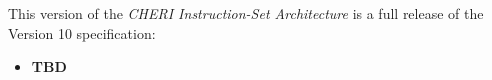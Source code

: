 This version of the \textit{CHERI Instruction-Set Architecture} is a full
release of the Version 10 specification:

\begin{itemize}
\item \textbf{TBD}
\end{itemize}
